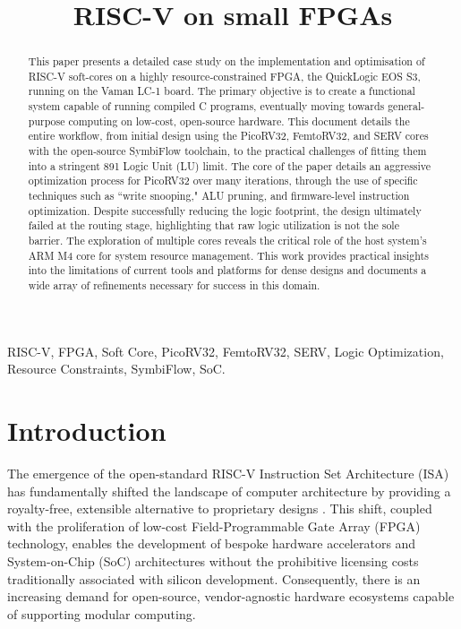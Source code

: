 \documentclass[conference]{IEEEtran}
\title{RISC-V on small FPGAs}
\author{
\IEEEauthorblockN{Subhodeep Chakraborty and G.V.V. Sharma}
\IEEEauthorblockA{
Department of Electrical Engineering\\
IIT Hyderabad\\
Email: ee25btech11055@iith.ac.in, gadepall@ee.iith.ac.in}
}
\begin{document}
\maketitle

\begin{abstract}
This paper presents a detailed case study on the implementation and optimisation of RISC-V soft-cores on a highly resource-constrained FPGA, the QuickLogic EOS S3, running on the Vaman LC-1 board. The primary objective is to create a functional system capable of running compiled C programs, eventually moving towards general-purpose computing on low-cost, open-source hardware. This document details the entire workflow, from initial design using the PicoRV32, FemtoRV32, and SERV cores with the open-source SymbiFlow toolchain, to the practical challenges of fitting them into a stringent 891 Logic Unit (LU) limit. The core of the paper details an aggressive optimization process for PicoRV32 over many iterations, through the use of specific techniques such as ``write snooping," ALU pruning, and firmware-level instruction optimization. Despite successfully reducing the logic footprint, the design ultimately failed at the routing stage, highlighting that raw logic utilization is not the sole barrier. The exploration of multiple cores reveals the critical role of the host system's ARM M4 core for system resource management. This work provides practical insights into the limitations of current tools and platforms for dense designs and documents a wide array of refinements necessary for success in this domain.
\end{abstract}

\begin{IEEEkeywords}
RISC-V, FPGA, Soft Core, PicoRV32, FemtoRV32, SERV, Logic Optimization, Resource Constraints, SymbiFlow, SoC.
\end{IEEEkeywords}

\section{Introduction}
The emergence of the open-standard RISC-V Instruction Set Architecture (ISA) has fundamentally shifted the landscape of computer architecture by providing a royalty-free, extensible alternative to proprietary designs \cite{riscv_spec}. This shift, coupled with the proliferation of low-cost Field-Programmable Gate Array (FPGA) technology, enables the development of bespoke hardware accelerators and System-on-Chip (SoC) architectures without the prohibitive licensing costs traditionally associated with silicon development. Consequently, there is an increasing demand for open-source, vendor-agnostic hardware ecosystems capable of supporting modular computing.
\end{document}

